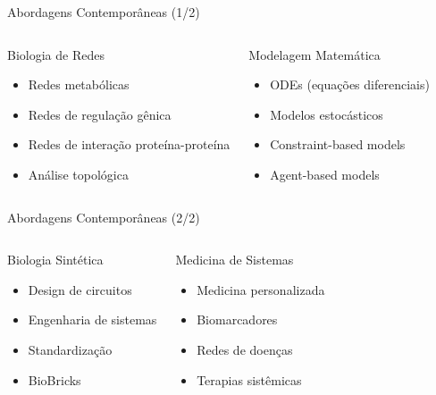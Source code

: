 \begin{frame}[allowframebreaks]{Abordagens Contemporâneas (1/2)}
\begin{columns}
\begin{block}{Biologia de Redes}
\begin{itemize}
    \item Redes metabólicas
    \item Redes de regulação gênica
    \item Redes de interação proteína-proteína
    \item Análise topológica
\end{itemize}
\end{block}

\begin{block}{Modelagem Matemática}
\begin{itemize}
    \item ODEs (equações diferenciais)
    \item Modelos estocásticos
    \item Constraint-based models
    \item Agent-based models
\end{itemize}
\end{block}
\end{columns}
\end{frame}

\begin{frame}[allowframebreaks]{Abordagens Contemporâneas (2/2)}
\begin{columns}
\begin{block}{Biologia Sintética}
\begin{itemize}
    \item Design de circuitos
    \item Engenharia de sistemas
    \item Standardização
    \item BioBricks
\end{itemize}
\end{block}

\begin{block}{Medicina de Sistemas}
\begin{itemize}
    \item Medicina personalizada
    \item Biomarcadores
    \item Redes de doenças
    \item Terapias sistêmicas
\end{itemize}
\end{block}
\end{columns}
\end{frame}

